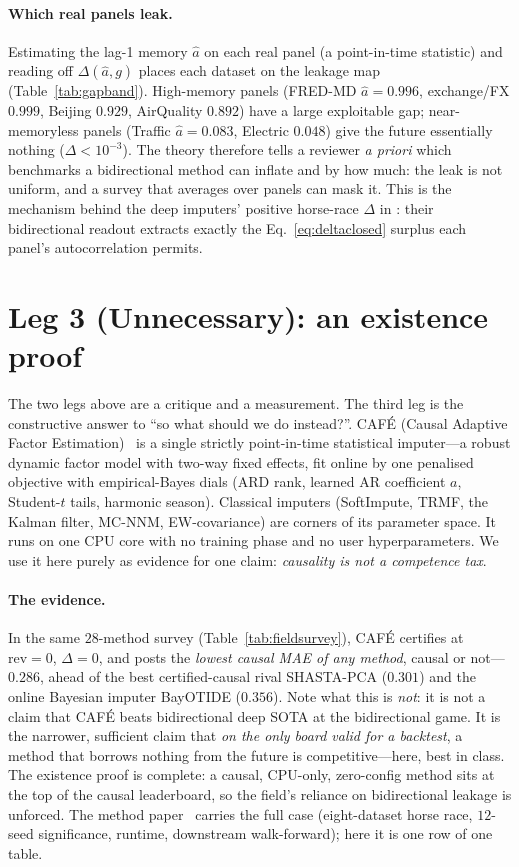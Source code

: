 \documentclass[10pt,twocolumn]{article}
\newcommand{\cafe}{CAF\'E}
\begin{document}
\paragraph{Which real panels leak.} Estimating the lag-1 memory $\hat a$ on each
real panel (a point-in-time statistic) and reading off $\Delta(\hat a,g)$ places
each dataset on the leakage map (Table~\ref{tab:gapband}). High-memory panels
(FRED-MD $\hat a{=}0.996$, exchange/FX $0.999$, Beijing $0.929$, AirQuality
$0.892$) have a large exploitable gap; near-memoryless panels (Traffic
$\hat a{=}0.083$, Electric $0.048$) give the future essentially nothing
($\Delta\!<\!10^{-3}$). The theory therefore tells a reviewer \emph{a priori}
which benchmarks a bidirectional method can inflate and by how much: the leak is
not uniform, and a survey that averages over panels can mask it. This is the
mechanism behind the deep imputers' positive horse-race $\Delta$ in
\cite{snow2025cafe}: their bidirectional readout extracts exactly the
Eq.~\eqref{eq:deltaclosed} surplus each panel's autocorrelation permits.



\section{Leg 3 (Unnecessary): an existence proof}\label{sec:cafe}
The two legs above are a critique and a measurement. The third leg is the
constructive answer to ``so what should we do instead?''. \cafe{} (Causal
Adaptive Factor Estimation)~\cite{snow2025cafe} is a single strictly
point-in-time statistical imputer---a robust dynamic factor model with two-way
fixed effects, fit online by one penalised objective with empirical-Bayes dials
(ARD rank, learned AR coefficient $a$, Student-$t$ tails, harmonic season).
Classical imputers (SoftImpute, TRMF, the Kalman filter, MC-NNM,
EW-covariance) are corners of its parameter space. It runs on one CPU core with no
training phase and no user hyperparameters. We use it here purely as evidence for
one claim: \emph{causality is not a competence tax}.

\paragraph{The evidence.} In the same $28$-method survey
(Table~\ref{tab:fieldsurvey}), \cafe{} certifies at $\mathrm{rev}=0$, $\Delta=0$,
and posts the \emph{lowest causal MAE of any method}, causal or not---$0.286$,
ahead of the best certified-causal rival SHASTA-PCA ($0.301$) and the online
Bayesian imputer BayOTIDE ($0.356$). Note what this is \emph{not}: it is not a
claim that \cafe{} beats bidirectional deep SOTA at the bidirectional game. It is
the narrower, sufficient claim that \emph{on the only board valid for a backtest},
a method that borrows nothing from the future is competitive---here, best in
class. The existence proof is complete: a causal, CPU-only, zero-config method
sits at the top of the causal leaderboard, so the field's reliance on
bidirectional leakage is unforced. The method paper~\cite{snow2025cafe} carries
the full case (eight-dataset horse race, $12$-seed significance, runtime,
downstream walk-forward); here it is one row of one table.
\end{document}
